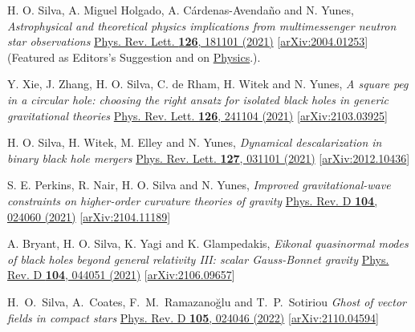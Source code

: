 \documentclass[10pt]{article}
\begin{document}
\begin{bibenum}
    \item H. O. Silva, A. Miguel Holgado, A. C\'{a}rdenas-Avenda\~{n}o and N. Yunes,
    \emph{Astrophysical and theoretical physics implications from multimessenger neutron star observations}
    \href{https://journals.aps.org/prl/abstract/10.1103/PhysRevLett.126.181101}{Phys. Rev. Lett. {\bf 126}, 181101 (2021)}
    [\href{https://arxiv.org/abs/2004.01253}{arXiv:2004.01253}]
    (Featured as {\color{venetianred}\sc Editors's Suggestion} and on \href{https://physics.aps.org/articles/v14/66}{Physics}.).
    \label{pub:SilvaPRL2021Nicer}

    \item Y. Xie, J. Zhang, H. O. Silva, C. de Rham, H. Witek and N. Yunes,
    \emph{A square peg in a circular hole: choosing the right ansatz for isolated black holes in generic gravitational theories}
    \href{https://journals.aps.org/prl/abstract/10.1103/PhysRevLett.126.241104}{Phys. Rev. Lett. {\bf 126}, 241104 (2021)}
    [\href{https://arxiv.org/abs/2103.03925}{arXiv:2103.03925}]

    \item H. O. Silva, H. Witek, M. Elley and N. Yunes,
    \emph{Dynamical descalarization in binary black hole mergers}
    \href{https://journals.aps.org/prl/abstract/10.1103/PhysRevLett.127.031101}{Phys. Rev. Lett. {\bf 127}, 031101 (2021)}
    [\href{https://arxiv.org/abs/2012.10436}{arXiv:2012.10436}]

    \item S. E. Perkins, R. Nair, H. O. Silva and N. Yunes,
    \emph{Improved gravitational-wave constraints on higher-order curvature theories of gravity}
    \href{https://journals.aps.org/prd/abstract/10.1103/PhysRevD.104.024060}{Phys. Rev. D {\bf 104}, 024060 (2021)}
    [\href{https://arxiv.org/abs/2104.11189}{arXiv:2104.11189}]

    \item A. Bryant, H. O. Silva, K. Yagi and K. Glampedakis,
    \emph{Eikonal quasinormal modes of black holes beyond general relativity III: scalar Gauss-Bonnet gravity}
    \href{https://journals.aps.org/prd/abstract/10.1103/PhysRevD.104.044051}{Phys. Rev. D {\bf 104}, 044051 (2021)}
    [\href{https://arxiv.org/abs/2106.09657}{arXiv:2106.09657}]

    \item H.~O.~Silva, A.~Coates, F.~M.~Ramazano\u{g}lu and T.~P.~Sotiriou
    \emph{Ghost of vector fields in compact stars}
    \href{https://journals.aps.org/prd/abstract/10.1103/PhysRevD.105.024046}{Phys. Rev. D {\bf 105}, 024046 (2022)}
    [\href{https://arxiv.org/abs/2110.04594}{arXiv:2110.04594}]


\end{bibenum}
\end{document}
